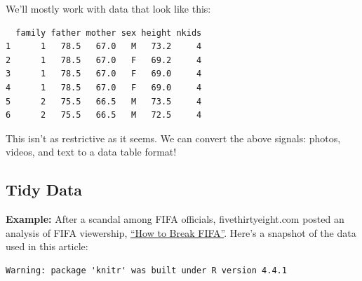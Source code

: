 \documentclass[
  letterpaper,
  DIV=11,
  numbers=noendperiod]{scrreprt}
\begin{document}
We'll mostly work with data that look like this:

\begin{verbatim}
  family father mother sex height nkids
1      1   78.5   67.0   M   73.2     4
2      1   78.5   67.0   F   69.2     4
3      1   78.5   67.0   F   69.0     4
4      1   78.5   67.0   F   69.0     4
5      2   75.5   66.5   M   73.5     4
6      2   75.5   66.5   M   72.5     4
\end{verbatim}

This isn't as restrictive as it seems. We can convert the above signals:
photos, videos, and text to a data table format!

\subsection{Tidy Data}\label{tidy-data}

\textbf{Example:} After a scandal among FIFA officials,
fivethirtyeight.com posted an analysis of FIFA viewership,
\href{https://fivethirtyeight.com/features/how-to-break-fifa/}{``How to
Break FIFA''}. Here's a snapshot of the data used in this article:

\begin{verbatim}
Warning: package 'knitr' was built under R version 4.4.1
\end{verbatim}
\end{document}
